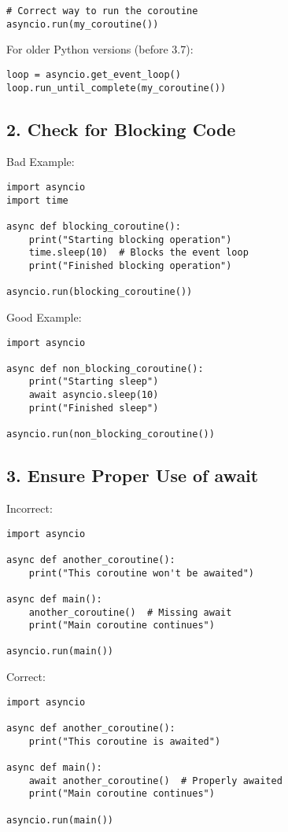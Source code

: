 \begin{tcolorbox}[
colback=pinkcolor!10!white,
colframe=pinkcolor!100!red,
left=2mm,
right=2mm,
title=\small\centering\textcolor{black}{Complete Guide to await asyncio.sleep() Issues},
breakable=true
]
\begin{verbatim}
# Correct way to run the coroutine
asyncio.run(my_coroutine())
\end{verbatim}

For older Python versions (before 3.7):
\begin{verbatim}
loop = asyncio.get_event_loop()
loop.run_until_complete(my_coroutine())
\end{verbatim}

\subsection*{2. Check for Blocking Code}
Bad Example:
\begin{verbatim}
import asyncio
import time

async def blocking_coroutine():
    print("Starting blocking operation")
    time.sleep(10)  # Blocks the event loop
    print("Finished blocking operation")

asyncio.run(blocking_coroutine())
\end{verbatim}

Good Example:
\begin{verbatim}
import asyncio

async def non_blocking_coroutine():
    print("Starting sleep")
    await asyncio.sleep(10)
    print("Finished sleep")

asyncio.run(non_blocking_coroutine())
\end{verbatim}

\subsection*{3. Ensure Proper Use of await}
Incorrect:
\begin{verbatim}
import asyncio

async def another_coroutine():
    print("This coroutine won't be awaited")

async def main():
    another_coroutine()  # Missing await
    print("Main coroutine continues")

asyncio.run(main())
\end{verbatim}

Correct:
\begin{verbatim}
import asyncio

async def another_coroutine():
    print("This coroutine is awaited")

async def main():
    await another_coroutine()  # Properly awaited
    print("Main coroutine continues")

asyncio.run(main())
\end{verbatim}


\end{tcolorbox}
